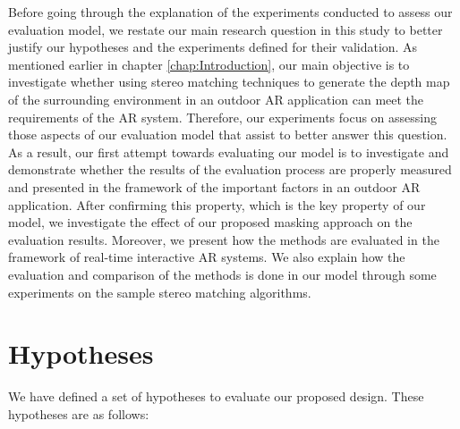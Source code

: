 Before going through the explanation of the experiments conducted to assess our evaluation model, we restate our main research question in this
study to better justify our hypotheses and the experiments defined for their validation. 
As mentioned earlier in chapter \ref{chap:Introduction}, our main objective is to investigate whether using 
stereo matching techniques to generate the depth map of the 
surrounding environment in an outdoor AR application can meet the requirements of the AR system. 
Therefore, our experiments focus 
on assessing those aspects of our evaluation model that assist to better answer this question.
As a result, our first attempt towards evaluating our model is to investigate and demonstrate whether the results of the evaluation process 
are properly measured and presented in the framework of the important factors in an outdoor AR application.
After confirming this property, which is the key property of our model, we investigate the effect of our proposed masking 
approach on the evaluation results. Moreover, we present how the methods are evaluated in the framework of 
real-time interactive AR systems.
We also explain how the evaluation and comparison of the methods is done in our model through some
experiments on the sample stereo matching algorithms.

\section{Hypotheses}

We have defined a set of hypotheses to evaluate our proposed design. These hypotheses are as follows:


